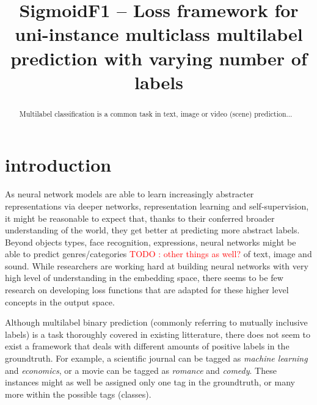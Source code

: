 \documentclass[sigconf,natbib,screen=true,review=true,anonymous]{acmart}
\newcommand\todo[1]{\textcolor{red}{TODO : #1}}
\begin{document}
\title{SigmoidF1 – Loss framework for uni-instance multiclass multilabel prediction with varying number of labels}







\begin{abstract}
Multilabel classification is a common task in text, image or video (scene) prediction...
\end{abstract}



\maketitle

\acresetall

\section{introduction}
\label{sec:org662677c}

As neural network models are able to learn increasingly abstracter representations via deeper networks, representation learning and self-supervision, it might be reasonable to expect that, thanks to their conferred broader understanding of the world, they get better at predicting more abstract labels. Beyond objects types, face recognition, expressions, neural networks might be able to predict genres/categories \todo{other things as well?} of text, image and sound. While researchers are working hard at building neural networks with very high level of understanding in the embedding space, there seems to be few research on developing loss functions that are adapted for these higher level concepts in the output space.

Although multilabel binary prediction (commonly referring to mutually inclusive labels) is a task thoroughly covered in existing litterature, there does not seem to exist a framework that deals with different amounts of positive labels in the groundtruth. For example, a scientific journal can be tagged as \emph{machine learning} and \emph{economics}, or a movie can be tagged as \emph{romance} and \emph{comedy}. These instances might as well be assigned only one tag in the groundtruth, or many more within the possible tags (classes).
\end{document}
